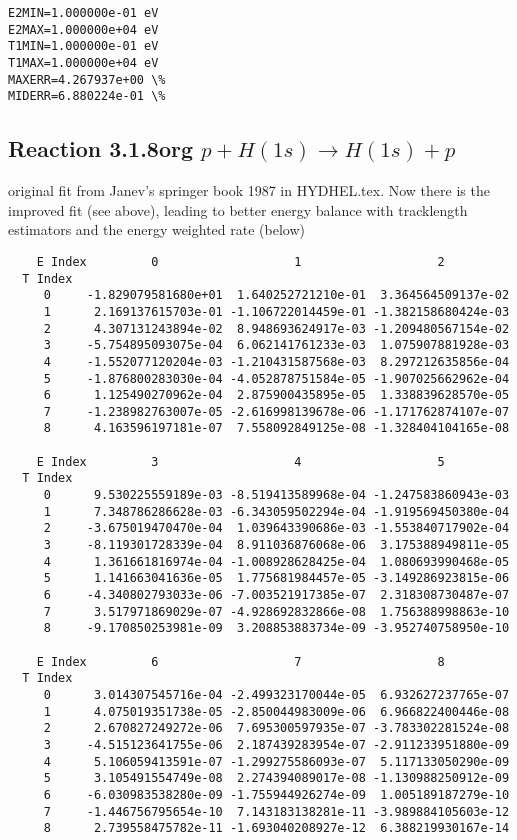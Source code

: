 \documentclass[12pt,dvipdfmx]{article}
\begin{document}
{\begin{small}
\begin{verbatim}
E2MIN=1.000000e-01 eV
E2MAX=1.000000e+04 eV
T1MIN=1.000000e-01 eV
T1MAX=1.000000e+04 eV
MAXERR=4.267937e+00 \%
MIDERR=6.880224e-01 \%
\end{verbatim}\end{small}
\newpage

\subsection{
Reaction 3.1.8org $ p + H(1s) \rightarrow H(1s) + p   $
}
original fit from Janev's springer book 1987
in HYDHEL.tex. Now there is the improved fit (see above), leading to better
energy balance with tracklength estimators and the energy weighted rate (below)

\begin{small}\begin{verbatim}
    E Index         0                   1                   2
  T Index
     0     -1.829079581680e+01  1.640252721210e-01  3.364564509137e-02
     1      2.169137615703e-01 -1.106722014459e-01 -1.382158680424e-03
     2      4.307131243894e-02  8.948693624917e-03 -1.209480567154e-02
     3     -5.754895093075e-04  6.062141761233e-03  1.075907881928e-03
     4     -1.552077120204e-03 -1.210431587568e-03  8.297212635856e-04
     5     -1.876800283030e-04 -4.052878751584e-05 -1.907025662962e-04
     6      1.125490270962e-04  2.875900435895e-05  1.338839628570e-05
     7     -1.238982763007e-05 -2.616998139678e-06 -1.171762874107e-07
     8      4.163596197181e-07  7.558092849125e-08 -1.328404104165e-08

    E Index         3                   4                   5
  T Index
     0      9.530225559189e-03 -8.519413589968e-04 -1.247583860943e-03
     1      7.348786286628e-03 -6.343059502294e-04 -1.919569450380e-04
     2     -3.675019470470e-04  1.039643390686e-03 -1.553840717902e-04
     3     -8.119301728339e-04  8.911036876068e-06  3.175388949811e-05
     4      1.361661816974e-04 -1.008928628425e-04  1.080693990468e-05
     5      1.141663041636e-05  1.775681984457e-05 -3.149286923815e-06
     6     -4.340802793033e-06 -7.003521917385e-07  2.318308730487e-07
     7      3.517971869029e-07 -4.928692832866e-08  1.756388998863e-10
     8     -9.170850253981e-09  3.208853883734e-09 -3.952740758950e-10

    E Index         6                   7                   8
  T Index
     0      3.014307545716e-04 -2.499323170044e-05  6.932627237765e-07
     1      4.075019351738e-05 -2.850044983009e-06  6.966822400446e-08
     2      2.670827249272e-06  7.695300597935e-07 -3.783302281524e-08
     3     -4.515123641755e-06  2.187439283954e-07 -2.911233951880e-09
     4      5.106059413591e-07 -1.299275586093e-07  5.117133050290e-09
     5      3.105491554749e-08  2.274394089017e-08 -1.130988250912e-09
     6     -6.030983538280e-09 -1.755944926274e-09  1.005189187279e-10
     7     -1.446756795654e-10  7.143183138281e-11 -3.989884105603e-12
     8      2.739558475782e-11 -1.693040208927e-12  6.388219930167e-14


\end{verbatim}
\end{small}}
\end{document}
